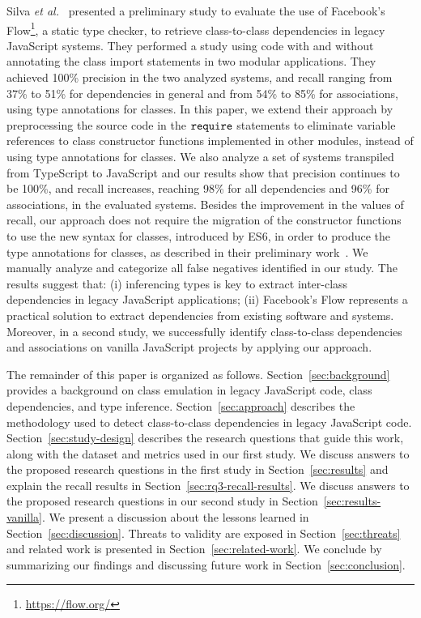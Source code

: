 \documentclass[review]{elsarticle}
\newcommand{\mcode}[1]{$\tt #1$}
\begin{document}
Silva \emph{et al.}~\cite{sanerera2017} presented a preliminary study to evaluate the use of Facebook's Flow\footnote{\url{https://flow.org/}}, a static type checker, to retrieve class-to-class dependencies in legacy JavaScript systems. They performed a study using code with and without annotating the class import statements in two modular applications. They achieved 100\% precision in the two analyzed systems, and recall ranging from 37\% to 51\% for dependencies in general and from 54\% to 85\% for associations, using type annotations for classes. In this paper, we extend their approach by preprocessing the source code in the \mcode{require} statements to eliminate variable references to class constructor functions implemented in other modules, instead of using type annotations for classes. We also analyze a set of systems transpiled from TypeScript to JavaScript and our results show that precision continues to be 100\%, and recall increases, reaching 98\% for all dependencies and 96\% for associations, in the evaluated systems. Besides the improvement in the values of recall, our approach does not require the migration of the constructor functions to use the new syntax for classes, introduced by ES6, in order to produce the type annotations for classes, as described in their preliminary work~\cite{sanerera2017}. We manually analyze and categorize all false negatives identified in our study. The results suggest that: (i) inferencing types is key to extract inter-class dependencies in legacy JavaScript applications; (ii) Facebook's Flow represents a practical solution to extract dependencies from existing software and systems. Moreover, in a second study, we successfully identify class-to-class dependencies and associations on vanilla JavaScript projects by applying our approach.

The remainder of this paper is organized as follows. Section~\ref{sec:background} provides a background on class emulation in legacy JavaScript code, class dependencies, and type inference. Section~\ref{sec:approach} describes the methodology used to detect class-to-class dependencies in legacy JavaScript code. Section~\ref{sec:study-design} describes the research questions that guide this work, along with the dataset and metrics used in our first study. We discuss answers to the proposed research questions in the first study in Section~\ref{sec:results} and explain the recall results in Section~\ref{sec:rq3-recall-results}. We discuss answers to the proposed research questions in our second study in Section~\ref{sec:results-vanilla}. We present a discussion about the lessons learned in Section~\ref{sec:discussion}. Threats to validity are exposed in Section~\ref{sec:threats} and related work is presented in Section~\ref{sec:related-work}. We conclude by summarizing our findings and discussing future work in Section~\ref{sec:conclusion}.
\end{document}
